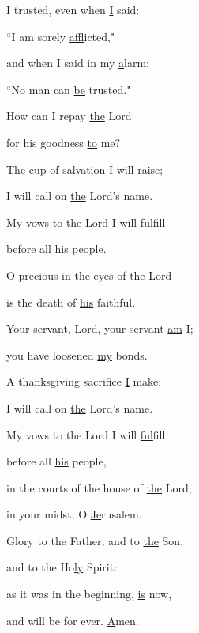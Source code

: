 \noindent I trusted, even when \uline{I} said:~\GreStar{}~\nopagebreak

``I am sorely \uline{af}flicted,"

\noindent and when I said in my \uline{a}larm:~\GreStar{}~\nopagebreak

``No man can \uline{be} trusted."

\noindent How can I repay \uline{the} Lord~\GreStar{}~\nopagebreak

for his goodness \uline{to} me?

\noindent The cup of salvation I \uline{will} raise;~\GreStar{}~\nopagebreak

I will call on \uline{the} Lord’s name.

\noindent My vows to the Lord I will \uline{ful}fill~\GreStar{}~\nopagebreak

before all \uline{his} people.

\noindent O precious in the eyes of \uline{the} Lord~\GreStar{}~\nopagebreak

is the death of \uline{his} faithful.

\noindent Your servant, Lord, your servant \uline{am} I;~\GreStar{}~\nopagebreak

you have loosened \uline{my} bonds.

\noindent A thanksgiving sacrifice \uline{I} make;~\GreStar{}~\nopagebreak

I will call on \uline{the} Lord’s name.

\noindent My vows to the Lord I will \uline{ful}fill~\GreStar{}~\nopagebreak

before all \uline{his} people,

\noindent in the courts of the house of \uline{the} Lord,~\GreStar{}~\nopagebreak

in your midst, O \uline{Je}rusalem.

\noindent Glory to the Father, and to \uline{the} Son,~\GreStar{}~\nopagebreak

and to the Ho\uline{ly} Spirit:

\noindent as it was in the beginning, \uline{is} now,~\GreStar{}~\nopagebreak

and will be for ever. \uline{A}men.
